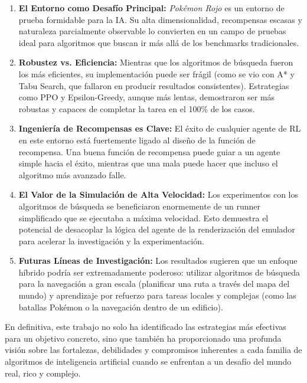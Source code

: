\documentclass[12pt, oneside, openany]{book}
\begin{document}
\begin{enumerate}
    \item \textbf{El Entorno como Desafío Principal:} \textit{Pokémon Rojo} es un entorno de prueba formidable para la IA. Su alta dimensionalidad, recompensas escasas y naturaleza parcialmente observable lo convierten en un campo de pruebas ideal para algoritmos que buscan ir más allá de los benchmarks tradicionales.
    \item \textbf{Robustez vs. Eficiencia:} Mientras que los algoritmos de búsqueda fueron los más eficientes, su implementación puede ser frágil (como se vio con A* y Tabu Search, que fallaron en producir resultados consistentes). Estrategias como PPO y Epsilon-Greedy, aunque más lentas, demostraron ser más robustas y capaces de completar la tarea en el 100\% de los casos.
    \item \textbf{Ingeniería de Recompensas es Clave:} El éxito de cualquier agente de RL en este entorno está fuertemente ligado al diseño de la función de recompensa. Una buena función de recompensa puede guiar a un agente simple hacia el éxito, mientras que una mala puede hacer que incluso el algoritmo más avanzado falle.
    \item \textbf{El Valor de la Simulación de Alta Velocidad:} Los experimentos con los algoritmos de búsqueda se beneficiaron enormemente de un runner simplificado que se ejecutaba a máxima velocidad. Esto demuestra el potencial de desacoplar la lógica del agente de la renderización del emulador para acelerar la investigación y la experimentación.
    \item \textbf{Futuras Líneas de Investigación:} Los resultados sugieren que un enfoque híbrido podría ser extremadamente poderoso: utilizar algoritmos de búsqueda para la navegación a gran escala (planificar una ruta a través del mapa del mundo) y aprendizaje por refuerzo para tareas locales y complejas (como las batallas Pokémon o la navegación dentro de un edificio).
\end{enumerate}

En definitiva, este trabajo no solo ha identificado las estrategias más efectivas para un objetivo concreto, sino que también ha proporcionado una profunda visión sobre las fortalezas, debilidades y compromisos inherentes a cada familia de algoritmos de inteligencia artificial cuando se enfrentan a un desafío del mundo real, rico y complejo.
\end{document}
